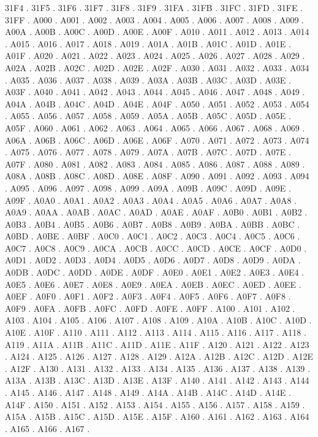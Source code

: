 31F4 .
31F5 .
31F6 .
31F7 .
31F8 .
31F9 .
31FA .
31FB .
31FC .
31FD .
31FE .
31FF .
A000 .
A001 .
A002 .
A003 .
A004 .
A005 .
A006 .
A007 .
A008 .
A009 .
A00A .
A00B .
A00C .
A00D .
A00E .
A00F .
A010 .
A011 .
A012 .
A013 .
A014 .
A015 .
A016 .
A017 .
A018 .
A019 .
A01A .
A01B .
A01C .
A01D .
A01E .
A01F .
A020 .
A021 .
A022 .
A023 .
A024 .
A025 .
A026 .
A027 .
A028 .
A029 .
A02A .
A02B .
A02C .
A02D .
A02E .
A02F .
A030 .
A031 .
A032 .
A033 .
A034 .
A035 .
A036 .
A037 .
A038 .
A039 .
A03A .
A03B .
A03C .
A03D .
A03E .
A03F .
A040 .
A041 .
A042 .
A043 .
A044 .
A045 .
A046 .
A047 .
A048 .
A049 .
A04A .
A04B .
A04C .
A04D .
A04E .
A04F .
A050 .
A051 .
A052 .
A053 .
A054 .
A055 .
A056 .
A057 .
A058 .
A059 .
A05A .
A05B .
A05C .
A05D .
A05E .
A05F .
A060 .
A061 .
A062 .
A063 .
A064 .
A065 .
A066 .
A067 .
A068 .
A069 .
A06A .
A06B .
A06C .
A06D .
A06E .
A06F .
A070 .
A071 .
A072 .
A073 .
A074 .
A075 .
A076 .
A077 .
A078 .
A079 .
A07A .
A07B .
A07C .
A07D .
A07E .
A07F .
A080 .
A081 .
A082 .
A083 .
A084 .
A085 .
A086 .
A087 .
A088 .
A089 .
A08A .
A08B .
A08C .
A08D .
A08E .
A08F .
A090 .
A091 .
A092 .
A093 .
A094 .
A095 .
A096 .
A097 .
A098 .
A099 .
A09A .
A09B .
A09C .
A09D .
A09E .
A09F .
A0A0 .
A0A1 .
A0A2 .
A0A3 .
A0A4 .
A0A5 .
A0A6 .
A0A7 .
A0A8 .
A0A9 .
A0AA .
A0AB .
A0AC .
A0AD .
A0AE .
A0AF .
A0B0 .
A0B1 .
A0B2 .
A0B3 .
A0B4 .
A0B5 .
A0B6 .
A0B7 .
A0B8 .
A0B9 .
A0BA .
A0BB .
A0BC .
A0BD .
A0BE .
A0BF .
A0C0 .
A0C1 .
A0C2 .
A0C3 .
A0C4 .
A0C5 .
A0C6 .
A0C7 .
A0C8 .
A0C9 .
A0CA .
A0CB .
A0CC .
A0CD .
A0CE .
A0CF .
A0D0 .
A0D1 .
A0D2 .
A0D3 .
A0D4 .
A0D5 .
A0D6 .
A0D7 .
A0D8 .
A0D9 .
A0DA .
A0DB .
A0DC .
A0DD .
A0DE .
A0DF .
A0E0 .
A0E1 .
A0E2 .
A0E3 .
A0E4 .
A0E5 .
A0E6 .
A0E7 .
A0E8 .
A0E9 .
A0EA .
A0EB .
A0EC .
A0ED .
A0EE .
A0EF .
A0F0 .
A0F1 .
A0F2 .
A0F3 .
A0F4 .
A0F5 .
A0F6 .
A0F7 .
A0F8 .
A0F9 .
A0FA .
A0FB .
A0FC .
A0FD .
A0FE .
A0FF .
A100 .
A101 .
A102 .
A103 .
A104 .
A105 .
A106 .
A107 .
A108 .
A109 .
A10A .
A10B .
A10C .
A10D .
A10E .
A10F .
A110 .
A111 .
A112 .
A113 .
A114 .
A115 .
A116 .
A117 .
A118 .
A119 .
A11A .
A11B .
A11C .
A11D .
A11E .
A11F .
A120 .
A121 .
A122 .
A123 .
A124 .
A125 .
A126 .
A127 .
A128 .
A129 .
A12A .
A12B .
A12C .
A12D .
A12E .
A12F .
A130 .
A131 .
A132 .
A133 .
A134 .
A135 .
A136 .
A137 .
A138 .
A139 .
A13A .
A13B .
A13C .
A13D .
A13E .
A13F .
A140 .
A141 .
A142 .
A143 .
A144 .
A145 .
A146 .
A147 .
A148 .
A149 .
A14A .
A14B .
A14C .
A14D .
A14E .
A14F .
A150 .
A151 .
A152 .
A153 .
A154 .
A155 .
A156 .
A157 .
A158 .
A159 .
A15A .
A15B .
A15C .
A15D .
A15E .
A15F .
A160 .
A161 .
A162 .
A163 .
A164 .
A165 .
A166 .
A167 .
